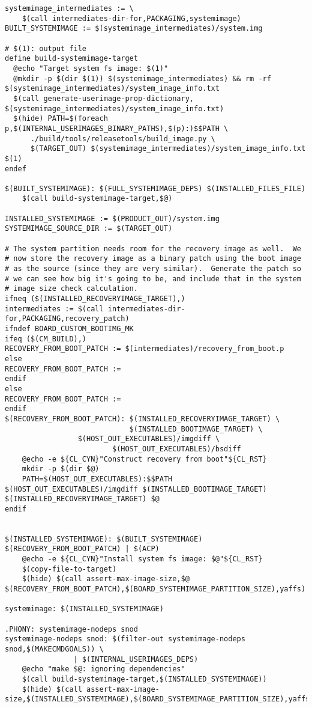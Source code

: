 \documentclass[12pt,a4paper]{article}
\begin{document}
\begin{verbatim}
systemimage_intermediates := \
    $(call intermediates-dir-for,PACKAGING,systemimage)
BUILT_SYSTEMIMAGE := $(systemimage_intermediates)/system.img

# $(1): output file
define build-systemimage-target
  @echo "Target system fs image: $(1)"
  @mkdir -p $(dir $(1)) $(systemimage_intermediates) && rm -rf $(systemimage_intermediates)/system_image_info.txt
  $(call generate-userimage-prop-dictionary, $(systemimage_intermediates)/system_image_info.txt)
  $(hide) PATH=$(foreach p,$(INTERNAL_USERIMAGES_BINARY_PATHS),$(p):)$$PATH \
      ./build/tools/releasetools/build_image.py \
      $(TARGET_OUT) $(systemimage_intermediates)/system_image_info.txt $(1)
endef

$(BUILT_SYSTEMIMAGE): $(FULL_SYSTEMIMAGE_DEPS) $(INSTALLED_FILES_FILE)
	$(call build-systemimage-target,$@)

INSTALLED_SYSTEMIMAGE := $(PRODUCT_OUT)/system.img
SYSTEMIMAGE_SOURCE_DIR := $(TARGET_OUT)

# The system partition needs room for the recovery image as well.  We
# now store the recovery image as a binary patch using the boot image
# as the source (since they are very similar).  Generate the patch so
# we can see how big it's going to be, and include that in the system
# image size check calculation.
ifneq ($(INSTALLED_RECOVERYIMAGE_TARGET),)
intermediates := $(call intermediates-dir-for,PACKAGING,recovery_patch)
ifndef BOARD_CUSTOM_BOOTIMG_MK
ifeq ($(CM_BUILD),)
RECOVERY_FROM_BOOT_PATCH := $(intermediates)/recovery_from_boot.p
else
RECOVERY_FROM_BOOT_PATCH :=
endif
else
RECOVERY_FROM_BOOT_PATCH :=
endif
$(RECOVERY_FROM_BOOT_PATCH): $(INSTALLED_RECOVERYIMAGE_TARGET) \
                             $(INSTALLED_BOOTIMAGE_TARGET) \
			     $(HOST_OUT_EXECUTABLES)/imgdiff \
	                     $(HOST_OUT_EXECUTABLES)/bsdiff
	@echo -e ${CL_CYN}"Construct recovery from boot"${CL_RST}
	mkdir -p $(dir $@)
	PATH=$(HOST_OUT_EXECUTABLES):$$PATH $(HOST_OUT_EXECUTABLES)/imgdiff $(INSTALLED_BOOTIMAGE_TARGET) $(INSTALLED_RECOVERYIMAGE_TARGET) $@
endif


$(INSTALLED_SYSTEMIMAGE): $(BUILT_SYSTEMIMAGE) $(RECOVERY_FROM_BOOT_PATCH) | $(ACP)
	@echo -e ${CL_CYN}"Install system fs image: $@"${CL_RST}
	$(copy-file-to-target)
	$(hide) $(call assert-max-image-size,$@ $(RECOVERY_FROM_BOOT_PATCH),$(BOARD_SYSTEMIMAGE_PARTITION_SIZE),yaffs)

systemimage: $(INSTALLED_SYSTEMIMAGE)

.PHONY: systemimage-nodeps snod
systemimage-nodeps snod: $(filter-out systemimage-nodeps snod,$(MAKECMDGOALS)) \
	            | $(INTERNAL_USERIMAGES_DEPS)
	@echo "make $@: ignoring dependencies"
	$(call build-systemimage-target,$(INSTALLED_SYSTEMIMAGE))
	$(hide) $(call assert-max-image-size,$(INSTALLED_SYSTEMIMAGE),$(BOARD_SYSTEMIMAGE_PARTITION_SIZE),yaffs)


\end{verbatim}
\end{document}
